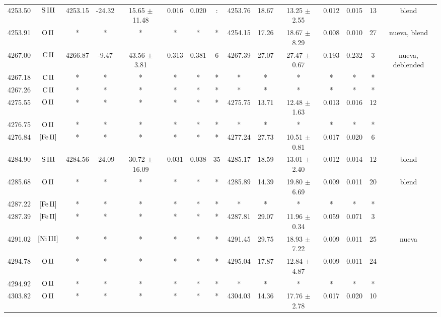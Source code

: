 \documentclass{article}
\begin{document}
\begin{table*}
\begin{adjustbox}{width=\textwidth}
\begin{tabular}{ccccccccccccccc}
4253.50 & $\mbox{S}\thinspace \mbox{III}$ & 4253.15 & -24.32 & 15.65 $\pm$ 11.48 & 0.016 & 0.020 & : & 4253.76 & 18.67 & 13.25 $\pm$ 2.55 & 0.012 & 0.015 & 13 &  blend \\
4253.91 & $\mbox{O}\thinspace \mbox{II}$ & * & * & * & * & * & * & 4254.15 & 17.26 & 18.67 $\pm$ 8.29 & 0.008 & 0.010 & 27 &  nueva, blend \\
4267.00 & $\mbox{C}\thinspace \mbox{II}$ & 4266.87 & -9.47 & 43.56 $\pm$ 3.81 & 0.313 & 0.381 & 6 & 4267.39 & 27.07 & 27.47 $\pm$ 0.67 & 0.193 & 0.232 & 3 &  nueva, deblended \\
4267.18 & $\mbox{C}\thinspace \mbox{II}$ & * & * & * & * & * & * & * & * & * & * & * & * &  \\
4267.26 & $\mbox{C}\thinspace \mbox{II}$ & * & * & * & * & * & * & * & * & * & * & * & * &  \\
4275.55 & $\mbox{O}\thinspace \mbox{II}$ & * & * & * & * & * & * & 4275.75 & 13.71 & 12.48 $\pm$ 1.63 & 0.013 & 0.016 & 12 &  \\
4276.75 & $\mbox{O}\thinspace \mbox{II}$ & * & * & * & * & * & * & * & * & * & * & * & * &  \\
4276.84 & $\mbox{[Fe}\thinspace \mbox{II]}$ & * & * & * & * & * & * & 4277.24 & 27.73 & 10.51 $\pm$ 0.81 & 0.017 & 0.020 & 6 &  \\
4284.90 & $\mbox{S}\thinspace \mbox{III}$ & 4284.56 & -24.09 & 30.72 $\pm$ 16.09 & 0.031 & 0.038 & 35 & 4285.17 & 18.59 & 13.01 $\pm$ 2.40 & 0.012 & 0.014 & 12 &  blend \\
4285.68 & $\mbox{O}\thinspace \mbox{II}$ & * & * & * & * & * & * & 4285.89 & 14.39 & 19.80 $\pm$ 6.69 & 0.009 & 0.011 & 20 &  blend \\
4287.22 & $\mbox{[Fe}\thinspace \mbox{II]}$ & * & * & * & * & * & * & * & * & * & * & * & * &  \\
4287.39 & $\mbox{[Fe}\thinspace \mbox{II]}$ & * & * & * & * & * & * & 4287.81 & 29.07 & 11.96 $\pm$ 0.34 & 0.059 & 0.071 & 3 &  \\
4291.02 & $\mbox{[Ni}\thinspace \mbox{III]}$ & * & * & * & * & * & * & 4291.45 & 29.75 & 18.93 $\pm$ 7.22 & 0.009 & 0.011 & 25 &  nueva \\
4294.78 & $\mbox{O}\thinspace \mbox{II}$ & * & * & * & * & * & * & 4295.04 & 17.87 & 12.84 $\pm$ 4.87 & 0.009 & 0.011 & 24 &  \\
4294.92 & $\mbox{O}\thinspace \mbox{II}$ & * & * & * & * & * & * & * & * & * & * & * & * &  \\
4303.82 & $\mbox{O}\thinspace \mbox{II}$ & * & * & * & * & * & * & 4304.03 & 14.36 & 17.76 $\pm$ 2.78 & 0.017 & 0.020 & 10 &  \\

\end{tabular}
\end{adjustbox}
\end{table*}
\end{document}

